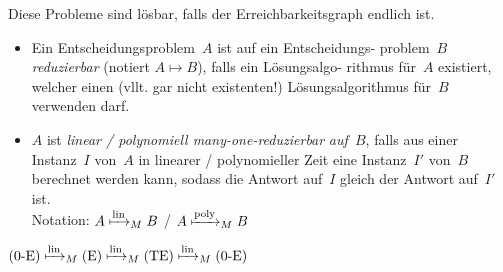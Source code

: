 \documentclass{cheat-sheet}
\newcommand{\reducesTo}{\mapsto} %
\newcommand{\reducesManyOneToLin}{\xmapsto{\mathrm{lin}}_M} %
\newcommand{\reducesManyOneToPoly}{\xmapsto{\mathrm{poly}}_M} %
\begin{document}
\begin{bem}
  Diese Probleme sind lösbar, falls der Erreichbarkeitsgraph endlich ist.
\end{bem}


\begin{defn}
  \begin{itemize}
    \item Ein Entscheidungsproblem~$A$ ist auf ein Entscheidungs- problem~$B$ \emph{reduzierbar} (notiert $A \reducesTo B$), falls ein Lösungsalgo- rithmus für~$A$ existiert, welcher einen (vllt. gar nicht existenten!) Lösungsalgorithmus für~$B$ verwenden darf.
    \item $A$ ist \emph{linear / polynomiell many-one-reduzierbar} \textit{auf~$B$}, falls aus einer Instanz~$I$ von~$A$ in linearer / polynomieller Zeit eine Instanz~$I'$ von~$B$ berechnet werden kann, sodass die Antwort auf~$I$ gleich der Antwort auf~$I'$ ist. \\
    Notation: $A \reducesManyOneToLin B$ / $A \reducesManyOneToPoly B$
  \end{itemize}
\end{defn}

\begin{satz}
  $\text{(0-E)} \reducesManyOneToLin \text{(E)} \reducesManyOneToLin \text{(TE)}  \reducesManyOneToLin \text{(0-E)}$
\end{satz}
\end{document}
